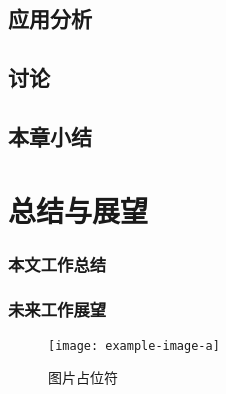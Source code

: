 \section{应用分析}
\section{讨论}
\section{本章小结}


\chapter{总结与展望}
\subsection{本文工作总结}
\subsection{未来工作展望}

\begin{figure}[htbp]
    \centering
    \texttt{[image: example-image-a]}
    \caption{\label{fig:fig-placeholder}图片占位符}
\end{figure}
